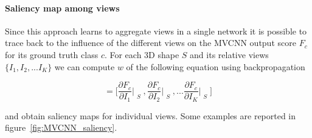 \paragraph{Saliency map among views}
Since this approach learns to aggregate views in a single network it is possible to trace back to the influence of the different views on the MVCNN output score $F_c$ for its ground truth class $c$. For each 3D shape $S$ and its relative views $\{I_1, I_2, ... I_K\}$ we can compute $w$ of the following equation using backpropagation

\begin{equation}
    [w_1, w_2, ... w_K] = \bigg[
    \frac{\partial F_c}{\partial I_1}\Bigr|_{\substack{S}},
    \frac{\partial F_c}{\partial I_2}\Bigr|_{\substack{S}},
    ... 
    \frac{\partial F_c}{\partial I_K}\Bigr|_{\substack{S}}
    \bigg]
\end{equation}

and obtain saliency maps for individual views. Some examples are reported in figure~\ref{fig:MVCNN_saliency}.



 




